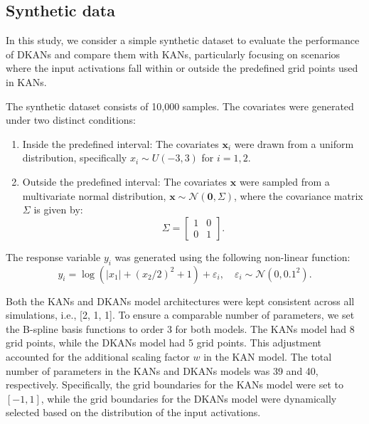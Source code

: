 \documentclass[11pt]{scrartcl}
\begin{document}
\subsection{Synthetic data}

In this study, we consider a simple synthetic dataset to evaluate the performance of DKANs and compare them with KANs, particularly focusing on scenarios where the input activations fall within or outside the predefined grid points used in KANs.

The synthetic dataset consists of 10,000 samples. The covariates were generated under two distinct conditions:
\begin{enumerate}
	\item Inside the predefined interval: The covariates $\mathbf{x}_{i}$ were drawn from a uniform distribution, specifically $x_{i} \sim U(-3, 3)$ for $i=1,2$.
	\item Outside the predefined interval: The covariates $\mathbf{x}$ were sampled from a multivariate normal distribution, $\mathbf{x} \sim \mathcal{N}(\mathbf{0}, \Sigma)$, where the covariance matrix $\Sigma$ is given by:
	      \begin{equation*}
		      \Sigma=\begin{bmatrix}
			      1 & 0 \\
			      0 & 1
		      \end{bmatrix}.
	      \end{equation*}
\end{enumerate}
The response variable $y_i$ was generated using the following non-linear function:
\begin{equation*}
	y_{i} = \log\left(|x_{1}| + (x_{2}/2)^{2} + 1\right) + \varepsilon_{i},\quad \varepsilon_{i} \sim \mathcal{N}(0, 0.1^{2}).
\end{equation*}

Both the KANs and DKANs model architectures were kept consistent across all simulations, i.e., [2, 1, 1]. To ensure a comparable number of parameters, we set the B-spline basis functions to order 3 for both models. The KANs model had 8 grid points, while the DKANs model had 5 grid points. This adjustment accounted for the additional scaling factor $w$ in the KAN model.
The total number of parameters in the KANs and DKANs models was 39 and 40, respectively.
Specifically, the grid boundaries for the KANs model were set to $[-1,1]$, while the grid boundaries for the DKANs model were dynamically selected based on the distribution of the input activations.
\end{document}
